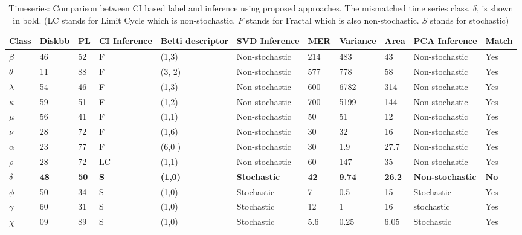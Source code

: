 \documentclass[10pt,conference]{IEEEtran}
\begin{document}
\begin{table}[t]
\caption{Timeseries: Comparison between CI based label and inference using proposed approaches. The mismatched time series class, $\delta$, is shown in bold. (LC stands for Limit Cycle \cite{Adegoke2018} which is non-stochastic, $F$ stands for Fractal which is also non-stochastic. $S$ stands for stochastic)}
\begin{center}
\begin{tabular}{|p{0.5cm}|p{0.75cm}|p{0.75cm}|p{1cm}|p{2.5cm}|p{3cm}|p{0.75cm}|p{1cm}|p{0.5cm}|p{1.8cm}|p{0.75cm}|}
\hline
Class & Diskbb & PL  & CI \newline Inference & Betti descriptor & SVD  \newline Inference & MER & Variance & Area & PCA \newline Inference  &  Match \\
\hline
$\beta$ & 46 & 52 & F & (1,3) & Non-stochastic & 214 & 483 & 43 & Non-stochastic & Yes\\
\hline
$\theta$  & 11 &  88 & F & (3, 2) & Non-stochastic & 577 & 778 & 58&Non-stochastic  &  Yes \\
\hline
$\lambda$ &  54 & 46 & F & (1,3) & Non-stochastic & 600 & 6782 & 314 & Non-stochastic & Yes \\
\hline
$\kappa$ &  59 & 51 & F & (1,2) & Non-stochastic & 700 & 5199 & 144 & Non-stochastic &  Yes \\
\hline
$\mu$  & 56 & 41 & F & (1,1) & Non-stochastic & 50 & 51 & 12 & Non-stochastic & Yes \\
\hline
$\nu$  & 28 & 72 & F & (1,6) & Non-stochastic & 30 & 32 & 16 & Non-stochastic & Yes\\
\hline
$\alpha$  & 23 & 77& F & (6,0 ) & Non-stochastic & 30 & 1.9 & 27.7 & Non-stochastic & Yes \\
\hline
$\rho$  & 28 & 72 & LC & (1,1) &  Non-stochastic & 60 & 147 & 35 & Non-stochastic & Yes \\
\hline
\textbf{$\delta$}  & \textbf{48} & \textbf{50} &  \textbf{S} & \textbf{(1,0)}& \textbf{Stochastic}& \textbf{42} & \textbf{9.74} & \textbf{26.2} & \textbf{Non-stochastic} &  \textbf{No} \\
\hline
$\phi$  & 50 & 34 & S & (1,0)& Stochastic & 7 & 0.5 & 15 & Stochastic &  Yes \\
\hline
$\gamma$  & 60 & 31 & S & (1,0)& Stochastic & 12 & 1 & 16 & stochastic &  Yes \\
\hline
$\chi$  & 09 & 89 & S & (1,0)& Stochastic & 5.6 & 0.25 & 6.05 & Stochastic &  Yes \\
\hline
\end{tabular}
\label{tab:results}
\end{center}
\end{table}
\end{document}
